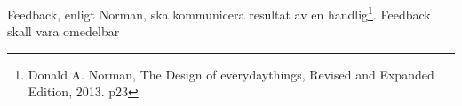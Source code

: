 Feedback, enligt Norman, ska kommunicera resultat av en handlig\footnote{Donald A. Norman, The Design of everydaythings, Revised and Expanded Edition, 2013. p23}.
Feedback skall vara omedelbar 